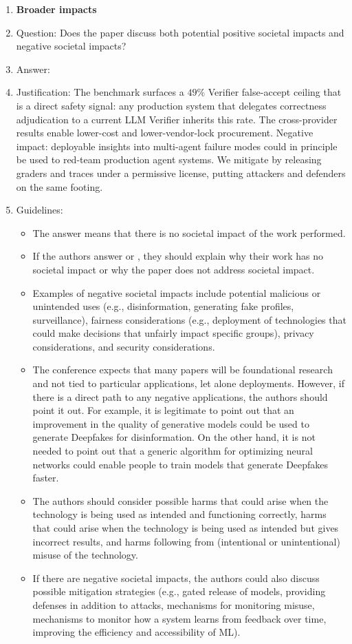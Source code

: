 \begin{enumerate}
\item {\bf Broader impacts}
    \item[] Question: Does the paper discuss both potential positive societal impacts and negative societal impacts?
    \item[] Answer: \answerYes{}
    \item[] Justification: The benchmark surfaces a $49\%$ Verifier false-accept ceiling that is a direct safety signal: any production system that delegates correctness adjudication to a current LLM Verifier inherits this rate. The cross-provider results enable lower-cost and lower-vendor-lock procurement. Negative impact: deployable insights into multi-agent failure modes could in principle be used to red-team production agent systems. We mitigate by releasing graders and traces under a permissive license, putting attackers and defenders on the same footing.
    \item[] Guidelines:
    \begin{itemize}
        \item The answer \answerNA{} means that there is no societal impact of the work performed.
        \item If the authors answer \answerNA{} or \answerNo, they should explain why their work has no societal impact or why the paper does not address societal impact.
        \item Examples of negative societal impacts include potential malicious or unintended uses (e.g., disinformation, generating fake profiles, surveillance), fairness considerations (e.g., deployment of technologies that could make decisions that unfairly impact specific groups), privacy considerations, and security considerations.
        \item The conference expects that many papers will be foundational research and not tied to particular applications, let alone deployments. However, if there is a direct path to any negative applications, the authors should point it out. For example, it is legitimate to point out that an improvement in the quality of generative models could be used to generate Deepfakes for disinformation. On the other hand, it is not needed to point out that a generic algorithm for optimizing neural networks could enable people to train models that generate Deepfakes faster.
        \item The authors should consider possible harms that could arise when the technology is being used as intended and functioning correctly, harms that could arise when the technology is being used as intended but gives incorrect results, and harms following from (intentional or unintentional) misuse of the technology.
        \item If there are negative societal impacts, the authors could also discuss possible mitigation strategies (e.g., gated release of models, providing defenses in addition to attacks, mechanisms for monitoring misuse, mechanisms to monitor how a system learns from feedback over time, improving the efficiency and accessibility of ML).
    \end{itemize}


\end{enumerate}
